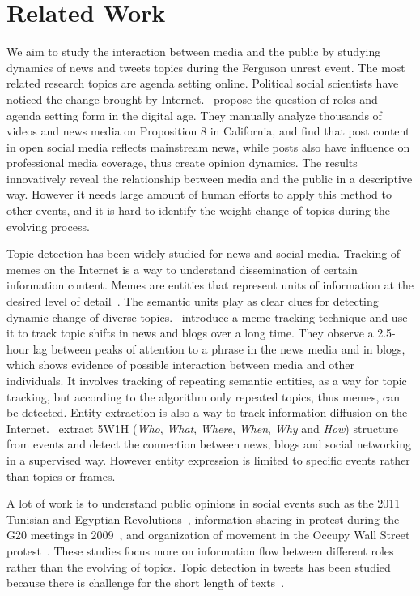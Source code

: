 \section{Related Work}
\label{sec:related_work}

We aim to study the interaction between media and the public by studying dynamics of news and tweets topics during the Ferguson unrest event. The most related research topics are agenda setting online. Political social scientists have noticed the change brought by Internet.~ propose the question of roles and agenda setting form in the digital age. They manually analyze thousands of videos and news media on Proposition 8 in California, and find that post content in open social media reflects mainstream news, while posts also have influence on professional media coverage, thus create opinion dynamics. The results innovatively reveal the relationship between media and the public in a descriptive way. However it needs large amount of human efforts to apply this method to other events, and it is hard to identify the weight change of topics during the evolving process.

Topic detection has been widely studied for news and social media. Tracking of memes on the Internet is a way to understand dissemination of certain information content. Memes are entities that represent units of information at the desired level of detail~\cite{ratkiewicz2010detecting}. The semantic units play as clear clues for detecting dynamic change of diverse topics.~ introduce a meme-tracking technique and use it to track topic shifts in news and blogs over a long time. They observe a 2.5-hour lag between peaks of attention to a phrase in the news media and in blogs, which shows evidence of possible interaction between media and other individuals. It involves tracking of repeating semantic entities, as a way for topic tracking, but according to the algorithm only repeated topics, thus memes, can be detected. Entity extraction is also a way to track information diffusion on the Internet.~ extract 5W1H (\emph{Who}, \emph{What}, \emph{Where}, \emph{When}, \emph{Why} and \emph{How}) structure from events and detect the connection between news, blogs and social networking in a supervised way. However entity expression is limited to specific events rather than topics or frames.

A lot of work is to understand public opinions in social events such as the 2011 Tunisian and Egyptian Revolutions~\cite{gonzalez2011dynamics}, information sharing in protest during the G20 meetings in 2009~\cite{earl2013protest}, and organization of movement in the Occupy Wall Street protest~\cite{conover2013geospatial}. These studies focus more on information flow between different roles rather than the evolving of topics. Topic detection in tweets has been studied because there is challenge for the short length of texts~\cite{yan2013biterm,zhao2011comparing}.

